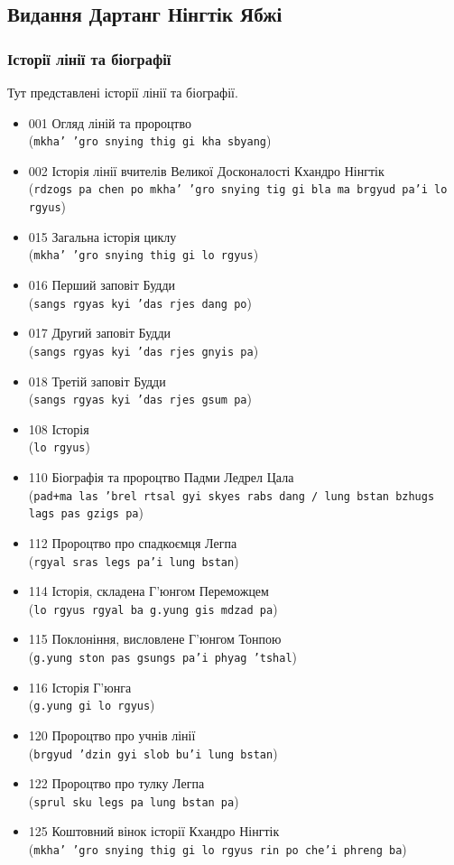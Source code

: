 \documentclass{article}
\begin{document}
\newpage
\subsection{Видання Дартанг Нінгтік Ябжі}

\subsubsection{Історії лінії та біографії}

Тут представлені історії лінії та біографії.

\begingroup\raggedright
\begin{itemize}
\item 001 Огляд ліній та пророцтво \\ (\texttt{mkha' 'gro snying thig gi kha sbyang})
\item 002 Історія лінії вчителів Великої Досконалості Кхандро Нінгтік \\ (\texttt{rdzogs pa chen po mkha' 'gro snying tig gi bla ma brgyud pa'i lo rgyus})
\item 015 Загальна історія циклу \\ (\texttt{mkha' 'gro snying thig gi lo rgyus})
\item 016 Перший заповіт Будди \\ (\texttt{sangs rgyas kyi 'das rjes dang po})
\item 017 Другий заповіт Будди \\ (\texttt{sangs rgyas kyi 'das rjes gnyis pa})
\item 018 Третій заповіт Будди \\ (\texttt{sangs rgyas kyi 'das rjes gsum pa})
\item 108 Історія \\ (\texttt{lo rgyus})
\item 110 Біографія та пророцтво Падми Ледрел Цала \\ (\texttt{pad+ma las 'brel rtsal gyi skyes rabs dang / lung bstan bzhugs lags pas gzigs pa})
\item 112 Пророцтво про спадкоємця Легпа \\ (\texttt{rgyal sras legs pa'i lung bstan})
\item 114 Історія, складена Г’юнгом Переможцем \\ (\texttt{lo rgyus rgyal ba g.yung gis mdzad pa})
\item 115 Поклоніння, висловлене Г’юнгом Тонпою \\ (\texttt{g.yung ston pas gsungs pa'i phyag 'tshal})
\item 116 Історія Г’юнга \\ (\texttt{g.yung gi lo rgyus})
\item 120 Пророцтво про учнів лінії \\ (\texttt{brgyud 'dzin gyi slob bu'i lung bstan})
\item 122 Пророцтво про тулку Легпа \\ (\texttt{sprul sku legs pa lung bstan pa})
\item 125 Коштовний вінок історії Кхандро Нінгтік \\ (\texttt{mkha' 'gro snying thig gi lo rgyus rin po che'i phreng ba})
\end{itemize}
\endgroup
\end{document}
